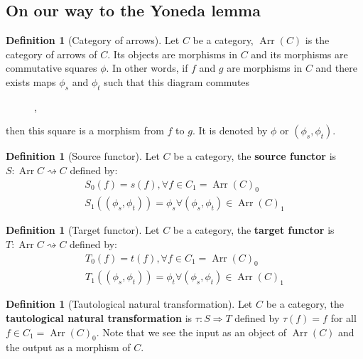 \documentclass{scrartcl}
\theoremstyle{definition}
\newtheorem{defn}[thm]{Definition}
\theoremstyle{remark}
\DeclareMathOperator{\arr}{Arr}
\begin{document}
\subsection{On our way to the Yoneda lemma}
\begin{defn}[Category of arrows]
    Let $C$ be a category, $\arr(C)$ is the category of arrows of $C$. Its objects are morphisms in $C$ and its morphisms are commutative squares $\phi$. In other words, if $f$ and $g$ are morphisms in $C$ and there exists maps $\phi_s$ and $\phi_t$ such that this diagram commutes
    \begin{figure}[h]
        \centering
        ,
    \end{figure}
    
    \noindent then this square is a morphism from $f$ to $g$. It is denoted by $\phi$ or $(\phi_s, \phi_t)$.
\end{defn}
\begin{defn}[Source functor]
    Let $C$ be a category, the \textbf{source functor} is $S:\arr{C}\rightsquigarrow C$ defined by:
    \begin{align*}
        S_0(f) = s(f), \forall f \in C_1 = \arr(C)_0\\
        S_1((\phi_s,\phi_t)) = \phi_s \forall (\phi_s,\phi_t) \in \arr(C)_1
    \end{align*}
\end{defn}
\begin{defn}[Target functor]
    Let $C$ be a category, the \textbf{target functor} is $T:\arr{C}\rightsquigarrow C$ defined by:
    \begin{align*}
        T_0(f) = t(f), \forall f \in C_1 = \arr(C)_0\\
        T_1((\phi_s,\phi_t)) = \phi_t \forall (\phi_s,\phi_t) \in \arr(C)_1
    \end{align*}
\end{defn}
\begin{defn}[Tautological natural transformation]
    Let $C$ be a category, the \textbf{tautological natural transformation} is $\tau: S \Rightarrow T$ defined by $\tau(f) = f$ for all $f\in C_1 = \arr(C)_0$. Note that we see the input as an object of $\arr(C)$ and the output as a morphism of $C$.
\end{defn}
\end{document}
